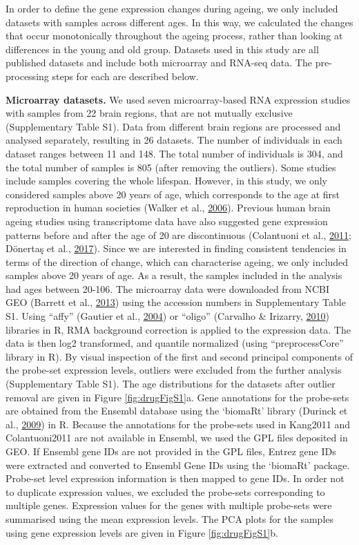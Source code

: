 \documentclass[12pt,twoside]{unicam}
\begin{document}
In order to define the gene expression changes during ageing, we only included datasets with samples across different ages. In this way, we calculated the changes that occur monotonically throughout the ageing process, rather than looking at differences in the young and old group. Datasets used in this study are all published datasets and include both microarray and RNA-seq data. The pre-processing steps for each are described below.

\textbf{Microarray datasets.} We used seven microarray-based RNA expression studies with samples from 22 brain regions, that are not mutually exclusive (Supplementary Table S1). Data from different brain regions are processed and analysed separately, resulting in 26 datasets. The number of individuals in each dataset ranges between 11 and 148. The total number of individuals is 304, and the total number of samples is 805 (after removing the outliers). Some studies include samples covering the whole lifespan. However, in this study, we only considered samples above 20 years of age, which corresponds to the age at first reproduction in human societies (Walker et al., \protect\hyperlink{ref-Walker2006}{2006}). Previous human brain ageing studies using transcriptome data have also suggested gene expression patterns before and after the age of 20 are discontinuous (Colantuoni et al., \protect\hyperlink{ref-Colantuoni2011}{2011}; Dönertaş et al., \protect\hyperlink{ref-Donertas2017}{2017}). Since we are interested in finding consistent tendencies in terms of the direction of change, which can characterise ageing, we only included samples above 20 years of age. As a result, the samples included in the analysis had ages between 20-106. The microarray data were downloaded from NCBI GEO (Barrett et al., \protect\hyperlink{ref-Barrett2013}{2013}) using the accession numbers in Supplementary Table S1. Using ``affy'' (Gautier et al., \protect\hyperlink{ref-Gautier2004}{2004}) or ``oligo'' (Carvalho \& Irizarry, \protect\hyperlink{ref-Carvalho2010}{2010}) libraries in R, RMA background correction is applied to the expression data. The data is then log2 transformed, and quantile normalized (using ``preprocessCore'' library in R). By visual inspection of the first and second principal components of the probe-set expression levels, outliers were excluded from the further analysis (Supplementary Table S1). The age distributions for the datasets after outlier removal are given in Figure \ref{fig:drugFigS1}a. Gene annotations for the probe-sets are obtained from the Ensembl database using the `biomaRt' library (Durinck et al., \protect\hyperlink{ref-Durinck2009}{2009}) in R. Because the annotations for the probe-sets used in Kang2011 and Colantuoni2011 are not available in Ensembl, we used the GPL files deposited in GEO. If Ensembl gene IDs are not provided in the GPL files, Entrez gene IDs were extracted and converted to Ensembl Gene IDs using the `biomaRt' package. Probe-set level expression information is then mapped to gene IDs. In order not to duplicate expression values, we excluded the probe-sets corresponding to multiple genes. Expression values for the genes with multiple probe-sets were summarised using the mean expression levels. The PCA plots for the samples using gene expression levels are given in Figure \ref{fig:drugFigS1}b.
\end{document}
